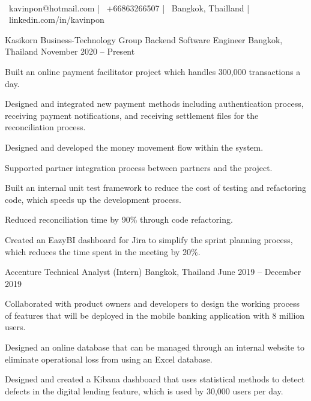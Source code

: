 \documentclass[]{awesome-cv}
\begin{document}
\begin{center}
	  \\
	\vspace{2mm}
	{\faEnvelope\ kavinpon@hotmail.com} | {\faMobile\ +66863266507} | {\faMapMarker\ Bangkok, Thailland} | {\faLinkedin\ linkedin.com/in/kavinpon}
\end{center}
\begin{cventries}
	\cventry
	{Kasikorn Business-Technology Group}
	{Backend Software Engineer}
	{Bangkok, Thailand}
	{November 2020 – Present}
	{\begin{cvitems}
			\item {Built an online payment facilitator project which handles 300,000 transactions a day.}
			\item {Designed and integrated new payment methods including authentication process, receiving payment notifications, and receiving settlement files for the reconciliation process.}
			\item {Designed and developed the money movement flow within the system.}
			\item {Supported partner integration process between partners and the project.}
			\item {Built an internal unit test framework to reduce the cost of testing and refactoring code, which speeds up the development process.}
			\item {Reduced reconciliation time by 90\% through code refactoring.}
			\item {Created an EazyBI dashboard for Jira to simplify the sprint planning process, which reduces the time spent in the meeting by 20\%.}
		\end{cvitems}}
	\cventry
	{Accenture}
	{Technical Analyst (Intern)}
	{Bangkok, Thailand}
	{June 2019 – December 2019}
	{\begin{cvitems}
			\item {Collaborated with product owners and developers to design the working process of features that will be deployed in the mobile banking application with 8 million users.}
			\item {Designed an online database that can be managed through an internal website to eliminate operational loss from using an Excel database.}
			\item {Designed and created a Kibana dashboard that uses statistical methods to detect defects in the digital lending feature, which is used by 30,000 users per day.}
		\end{cvitems}}
\end{cventries}
\end{document}

